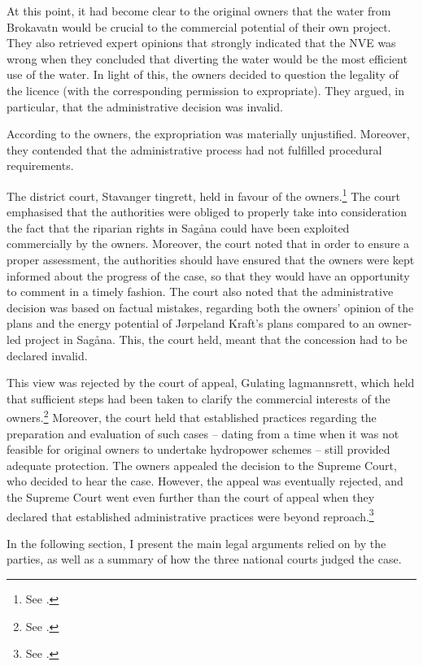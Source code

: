 At this point, it had become clear to the original owners that the water from Brokavatn would be crucial to the commercial potential of their own project. They also retrieved expert opinions that strongly indicated that the NVE was wrong when they concluded that diverting the water would be the most efficient use of the water. In light of this, the owners decided to question the legality of the licence (with the corresponding permission to expropriate). They argued, in particular, that the administrative decision was invalid.

According to the owners, the expropriation was materially unjustified. Moreover, they contended that the administrative process had not fulfilled procedural requirements. 

The district court, Stavanger tingrett, held in favour of the owners.\footnote{See \cite{jorpeland09}.} The court emphasised that the authorities were obliged to properly take into consideration the fact that the riparian rights in Sagåna could have been exploited commercially by the owners. Moreover, the court noted that in order to ensure a proper assessment, the authorities should have ensured that the owners were kept informed about the progress of the case, so that they would have an opportunity to comment in a timely fashion. The court also noted that the administrative decision was based on factual mistakes, regarding both the owners' opinion of the plans and the energy potential of Jørpeland Kraft's plans compared to an owner-led project in Sagåna. This, the court held, meant that the concession had to be declared invalid.

This view was rejected by the court of appeal, Gulating lagmannsrett, which held that sufficient steps had been taken to clarify the commercial interests of the owners.\footnote{See \cite{jorpeland11a}.} Moreover, the court held that established practices regarding the preparation and evaluation of such cases -- dating from a time when it was not feasible for original owners to undertake hydropower schemes -- still provided adequate protection. The owners appealed the decision to the Supreme Court, who decided to hear the case. However, the appeal was eventually rejected, and the Supreme Court went even further than the court of appeal when they declared that established administrative practices were beyond reproach.\footnote{See \cite{jorpeland11}.}

In the following section, I present the main legal arguments relied on by the parties, as well as a summary of how the three national courts judged the case.

